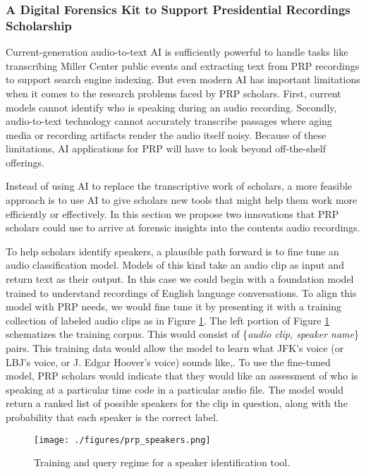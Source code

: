 \documentclass[12pt, oneside]{article}   	%
\begin{document}
\subsubsection{A Digital Forensics Kit to Support Presidential Recordings Scholarship}\label{section.applications.hard.prp}
Current-generation audio-to-text AI is sufficiently powerful to handle tasks like transcribing Miller Center public events and extracting text from PRP recordings to support search engine indexing.  But even modern AI has important limitations when it comes to the research problems faced by PRP scholars.  First, current models cannot identify who is speaking during an audio recording.  Secondly, audio-to-text technology cannot accurately transcribe passages where aging media or recording artifacts render the audio itself noisy.   Because of these limitations, AI applications for PRP will have to look beyond off-the-shelf offerings.  


Instead of using AI to replace the transcriptive work of scholars, a more feasible approach is to use AI to give scholars new tools that might help them work more efficiently or effectively.  In this section we propose two innovations that PRP scholars could use to arrive at forensic insights into the contents audio recordings.

To help scholars identify speakers, a plausible path forward is to fine tune an audio classification model.  Models of this kind take an audio clip as input and return text as their output.  In this case we could begin with a foundation model trained to understand recordings of English language conversations.  To align this model with PRP needs, we would fine tune it by presenting it with a training collection of labeled audio clips as in Figure \ref{figure.prpspeakers}.  The left portion of Figure \ref{figure.prpspeakers} schematizes the training corpus.  This would consist of \{\emph{audio clip, speaker name}\} pairs.  This training data would allow the model to learn what JFK's voice (or LBJ's voice, or J. Edgar Hoover's voice) sounds like,.  To use the fine-tuned model, PRP scholars would indicate that they would like an assessment of who is speaking at a particular time code in a particular audio file.  The model would return a ranked list of possible speakers for the clip in question, along with the probability that each speaker is the correct label.  

\begin{figure}[htbp]
\begin{center}
\texttt{[image: ./figures/prp\_speakers.png]}
\caption{Training and query regime for a speaker identification tool.}
\label{figure.prpspeakers}
\end{center}
\end{figure}
\end{document}
